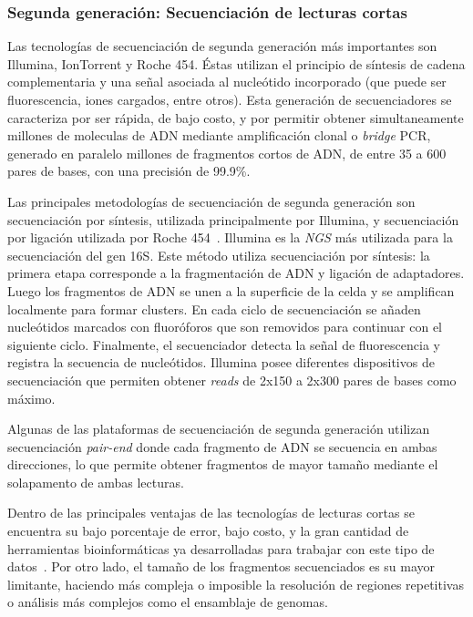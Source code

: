 \subsubsection{Segunda generación: Secuenciación de lecturas cortas}
Las tecnologías de secuenciación de segunda generación más importantes son Illumina, IonTorrent y Roche 454. Éstas utilizan el principio de síntesis de cadena complementaria y una señal asociada al nucleótido incorporado (que puede ser fluorescencia, iones cargados, entre otros). %
Esta generación de secuenciadores se caracteriza por ser rápida, de bajo costo, y por permitir obtener simultaneamente millones de moleculas de ADN mediante amplificación clonal o \textit{bridge} PCR, generado en paralelo millones de fragmentos cortos de ADN, de entre 35 a 600 pares de bases, con una precisión de 99.9\%.%


Las principales metodologías de secuenciación de segunda generación son secuenciación por síntesis, utilizada principalmente por Illumina, y secuenciación por ligación utilizada por Roche 454~\cite{mardis2008next}.
Illumina es la \textit{NGS} más utilizada para la secuenciación del gen 16S. Este método utiliza secuenciación por síntesis: la primera etapa corresponde a la fragmentación de ADN y ligación de adaptadores.
Luego los fragmentos de ADN se unen a la superficie de la celda y se amplifican localmente para formar clusters. 
En cada ciclo de secuenciación se añaden nucleótidos marcados con fluoróforos que son removidos para continuar con el siguiente ciclo.
Finalmente, el secuenciador detecta la señal de fluorescencia y registra la secuencia de nucleótidos. 
Illumina posee diferentes dispositivos de secuenciación que permiten obtener \textit{reads} de 2x150 a 2x300 pares de bases como máximo.

Algunas de las plataformas de secuenciación de segunda generación utilizan secuenciación \textit{pair-end} donde cada fragmento de ADN se secuencia en ambas direcciones,  lo que permite obtener fragmentos de mayor tamaño mediante el solapamento de ambas lecturas. 

Dentro de las principales ventajas de las tecnologías de lecturas cortas se encuentra su bajo porcentaje de error, bajo costo, y la gran cantidad de herramientas bioinformáticas ya desarrolladas para trabajar con este tipo de datos~\cite{heather2016sequence}. Por otro lado, el tamaño de los fragmentos secuenciados es su mayor limitante, haciendo más compleja o imposible la resolución de regiones repetitivas o análisis más complejos como el ensamblaje de genomas.



